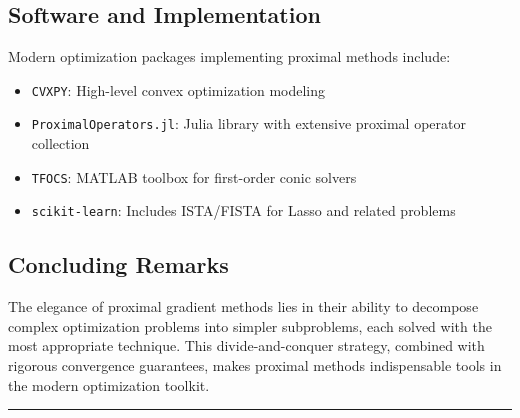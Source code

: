 \documentclass[12pt]{article}
\theoremstyle{definition}
\begin{document}
\subsection{Software and Implementation}

Modern optimization packages implementing proximal methods include:
\begin{itemize}[leftmargin=*]
    \item \texttt{CVXPY}: High-level convex optimization modeling
    \item \texttt{ProximalOperators.jl}: Julia library with extensive proximal operator collection
    \item \texttt{TFOCS}: MATLAB toolbox for first-order conic solvers
    \item \texttt{scikit-learn}: Includes ISTA/FISTA for Lasso and related problems
\end{itemize}

\subsection{Concluding Remarks}

The elegance of proximal gradient methods lies in their ability to decompose complex optimization problems into simpler subproblems, each solved with the most appropriate technique. This divide-and-conquer strategy, combined with rigorous convergence guarantees, makes proximal methods indispensable tools in the modern optimization toolkit.


\vspace{1cm}
\hrule
\vspace{0.5cm}
\end{document}
